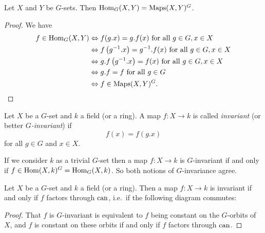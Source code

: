 \begin{lem}
  Let $X$ and $Y$ be $G$-sets.
  Then $\operatorname{Hom}_G(X,Y) = \operatorname{Maps}(X,Y)^G$.
\end{lem}
\begin{proof}
  We have
  \begin{align*}
                      f \in \operatorname{Hom}_G(X,Y)
    &\Leftrightarrow    f(g.x)
                      = g.f(x)
                      \text{ for all }
                      g \in G, x \in X \\
    &\Leftrightarrow    f\left(g^{-1}.x\right)
                      = g^{-1}.f(x)
                      \text{ for all }
                      g \in G, x \in X \\
    &\Leftrightarrow    g.f\left(g^{-1}.x\right)
                      = f(x)
                      \text{ for all }
                      g \in G, x \in X \\
    &\Leftrightarrow    g.f
                      = f
                      \text{ for all }
                      g \in G \\
    &\Leftrightarrow  f \in \operatorname{Maps}(X,Y)^G.
    \qedhere
  \end{align*}
\end{proof}


\begin{defi}
  Let $X$ be a $G$-set and $k$ a field (or a ring).
  A map $f \colon X \to k$ is called \emph{invariant} (or better \emph{$G$-invariant}) if
  \[
      f(x)
    = f\left( g.x \right)
  \]
  for all $g \in G$ and $x \in X$.
\end{defi}


\begin{note}
  If we consider $k$ as a trivial $G$-set then a map $f \colon X \to k$ is $G$-invariant if and only if $f \in \operatorname{Hom}(X,k)^G = \operatorname{Hom}_G(X,k)$.
  So both notions of $G$-invariance agree.
\end{note}


\begin{lem}
  Let $X$ be a $G$-set and $k$ a field (or a ring).
  Then a map $f \colon X \to k$ is invariant if and only if $f$ factors through $\operatorname{can}$, i.e.\ if the following diagram commutes:
  \begin{center}
  \end{center}
\end{lem}
\begin{proof}
  That $f$ is $G$-invariant is equivalent to $f$ being constant on the $G$-orbits of $X$, and $f$ is constant on these orbits if and only if $f$ factors through $\operatorname{can}$.
\end{proof}


